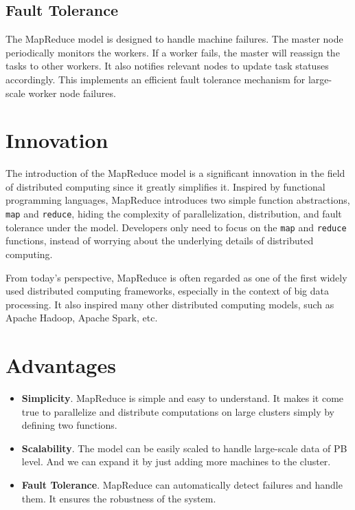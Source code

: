 \documentclass[10pt]{article}
\begin{document}
\subsection{Fault Tolerance}

The MapReduce model is designed to handle machine failures. 
The master node periodically monitors the workers. 
If a worker fails, the master will reassign the tasks to other workers. 
It also notifies relevant nodes to update task statuses accordingly.
This implements an efficient fault tolerance mechanism for large-scale worker node failures.

\section{Innovation}

The introduction of the MapReduce model is a significant innovation in the field of distributed computing since it greatly simplifies it.
Inspired by functional programming languages, MapReduce introduces two simple function abstractions, \texttt{map} and \texttt{reduce}, hiding the complexity of parallelization, distribution, and fault tolerance under the model.
Developers only need to focus on the \texttt{map} and \texttt{reduce} functions, instead of worrying about the underlying details of distributed computing.

From today's perspective, MapReduce is often regarded as one of the first widely used distributed computing frameworks, especially in the context of big data processing.
It also inspired many other distributed computing models, such as Apache Hadoop, Apache Spark, etc.

\section{Advantages}

\begin{itemize}
    \item \textbf{Simplicity}. MapReduce is simple and easy to understand. It makes it come true to parallelize and distribute computations on large clusters simply by defining two functions.
    \item \textbf{Scalability}. The model can be easily scaled to handle large-scale data of PB level. And we can expand it by just adding more machines to the cluster.
    \item \textbf{Fault Tolerance}. MapReduce can automatically detect failures and handle them. It ensures the robustness of the system.
\end{itemize}
\end{document}
